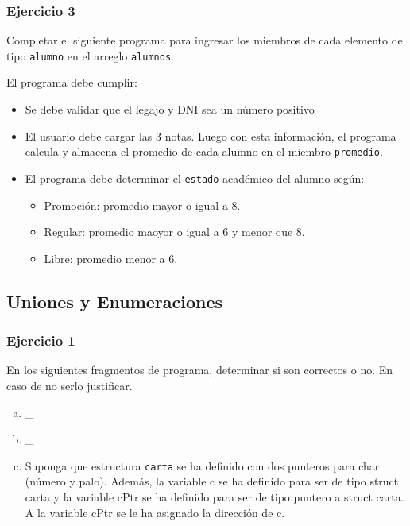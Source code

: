 \subsubsection{Ejercicio 3} 
 Completar el siguiente programa para ingresar los miembros de cada elemento de tipo \texttt{alumno} en el arreglo \texttt{alumnos}.
\lstset{inputencoding=utf8/latin1}

El programa debe cumplir:
\begin{itemize}
  \item Se debe validar que el legajo y DNI sea un número positivo
  \item El usuario debe cargar las 3 notas. Luego con esta información, el programa calcula y almacena el promedio de cada alumno en el miembro \texttt{promedio}.
  \item El programa debe determinar el \texttt{estado} académico del alumno según:
    \begin{itemize}
      \item Promoción: promedio mayor o igual a 8.
      \item Regular: promedio maoyor o igual a 6 y menor que 8.
      \item Libre: promedio menor a 6.
    \end{itemize}
\end{itemize}

\subsection*{Uniones y Enumeraciones}

\subsubsection{Ejercicio 1} 
En los siguientes fragmentos de programa, determinar si son correctos o no. En caso de no serlo justificar.
\begin{enumerate}[a)]
  \item \_
  \lstset{inputencoding=utf8/latin1}
  
  \item \_
  \lstset{inputencoding=utf8/latin1}
  
  \item Suponga que estructura \texttt{carta} se ha definido con dos punteros para char (número y palo).
    Además, la variable c se ha definido para ser de tipo struct carta y la variable cPtr se ha definido para ser de tipo puntero a struct carta. 
    A la variable cPtr se le ha asignado la dirección de c.
  \lstset{inputencoding=utf8/latin1}
  
\end{enumerate}
